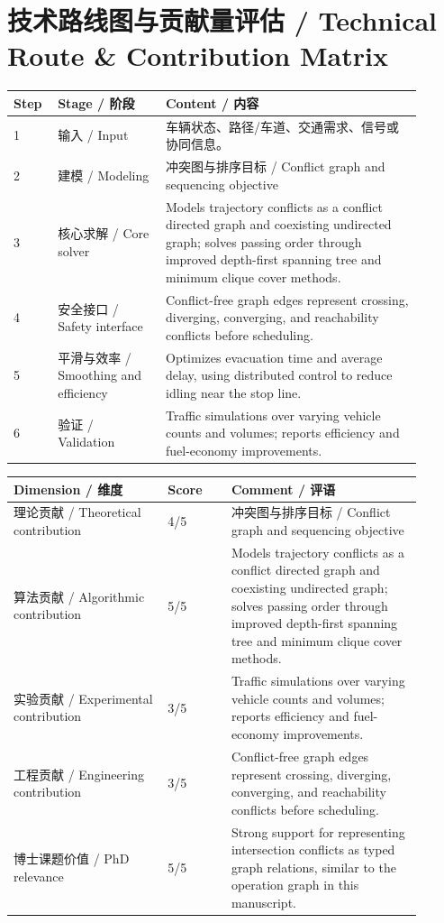 \documentclass[UTF8,a4paper,11pt,fontset=fandol]{ctexart}
\begin{document}
\section{技术路线图与贡献量评估 / Technical Route \& Contribution Matrix}
\begin{longtable}{p{0.08\linewidth}p{0.24\linewidth}p{0.58\linewidth}}
\toprule
Step & Stage / 阶段 & Content / 内容\\
\midrule
1 & 输入 / Input & 车辆状态、路径/车道、交通需求、信号或协同信息。 \\
2 & 建模 / Modeling & 冲突图与排序目标 / Conflict graph and sequencing objective \\
3 & 核心求解 / Core solver & Models trajectory conflicts as a conflict directed graph and coexisting undirected graph; solves passing order through improved depth-first spanning tree and minimum clique cover methods. \\
4 & 安全接口 / Safety interface & Conflict-free graph edges represent crossing, diverging, converging, and reachability conflicts before scheduling. \\
5 & 平滑与效率 / Smoothing and efficiency & Optimizes evacuation time and average delay, using distributed control to reduce idling near the stop line. \\
6 & 验证 / Validation & Traffic simulations over varying vehicle counts and volumes; reports efficiency and fuel-economy improvements. \\
\bottomrule
\end{longtable}

\begin{longtable}{p{0.34\linewidth}p{0.14\linewidth}p{0.42\linewidth}}
\toprule
Dimension / 维度 & Score & Comment / 评语\\
\midrule
理论贡献 / Theoretical contribution & 4/5 & 冲突图与排序目标 / Conflict graph and sequencing objective \\
算法贡献 / Algorithmic contribution & 5/5 & Models trajectory conflicts as a conflict directed graph and coexisting undirected graph; solves passing order through improved depth-first spanning tree and minimum clique cover methods. \\
实验贡献 / Experimental contribution & 3/5 & Traffic simulations over varying vehicle counts and volumes; reports efficiency and fuel-economy improvements. \\
工程贡献 / Engineering contribution & 3/5 & Conflict-free graph edges represent crossing, diverging, converging, and reachability conflicts before scheduling. \\
博士课题价值 / PhD relevance & 5/5 & Strong support for representing intersection conflicts as typed graph relations, similar to the operation graph in this manuscript. \\
\bottomrule
\end{longtable}
\end{document}

